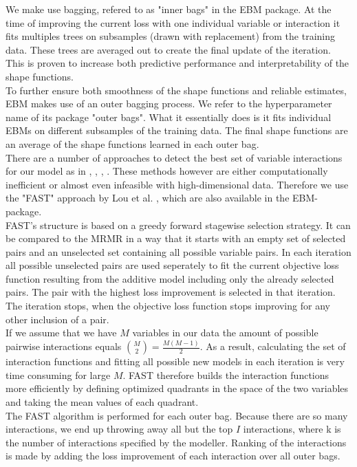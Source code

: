 \documentclass[12pt,titlepage]{article}
\begin{document}
\noindent
We make use bagging, refered to as "inner bags" in the EBM package. At the time of improving the current loss with one individual variable or interaction it fits multiples trees on subsamples (drawn with replacement) from the training data. These trees are averaged out to create the final update of the iteration. This is proven to increase both predictive performance and interpretability of the shape functions.\\
To further ensure both smoothness of the shape functions and reliable estimates, EBM makes use of an outer bagging process. We refer to the hyperparameter name of its package "outer bags". What it essentially does is it fits individual EBMs on different subsamples of the training data. The final shape functions are an average of the shape functions learned in each outer bag. \\

There are a number of approaches to detect the best set of variable interactions for our model as in \cite{anova_interaction}, \cite{pdf_interaction}, \cite{guide}, \cite{grove}. These methods however are either computationally inefficient or almost even infeasible with high-dimensional data. Therefore we use the "FAST" approach by Lou et al. \cite{ga2m}, which are also available in the EBM-package. \\
FAST's structure is based on a greedy forward stagewise selection strategy. It can be compared to the MRMR in a way that it starts with an empty set of selected pairs and an unselected set containing all possible variable pairs. In each iteration all possible unselected pairs are used seperately to fit the current objective loss function resulting from the additive model including only the already selected pairs. The pair with the highest loss improvement is selected in that iteration. The iteration stops, when the objective loss function stops improving for any other inclusion of a pair. \\
If we assume that we have $M$ variables in our data the amount of possible pairwise interactions equals $\binom{M}{2} = \frac{M(M-1)}{2}$. As a result, calculating the set of interaction functions and fitting all possible new models in each iteration is very time consuming for large $M$. FAST therefore builds the interaction functions more efficiently by defining optimized quadrants in the space of the two variables and taking the mean values of each quadrant. \\
The FAST algorithm is performed for each outer bag. Because there are so many interactions, we end up throwing away all but the top $I$ interactions, where k is the number of interactions specified by the modeller. Ranking of the interactions is made by adding the loss improvement of each interaction over all outer bags. \\
\end{document}
